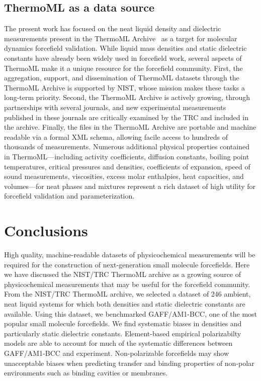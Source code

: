 \documentclass[aip, jcp, reprint]{revtex4-1}  %
\begin{document}
\subsection{ThermoML as a data source}

The present work has focused on the neat liquid density and dielectric measurements present in the ThermoML Archive~\cite{frenkel2006xml, frenkel2003thermoml, chirico2003thermoml} as a target for molecular dynamics forcefield validation.  
While liquid mass densities and static dielectric constants have already been widely used in forcefield work, several aspects of ThermoML make it a unique resource for the forcefield community.  
First, the aggregation, support, and dissemination of ThermoML datasets through the ThermoML Archive is supported by NIST, whose mission makes these tasks a long-term priority.  
Second, the ThermoML Archive is actively growing, through partnerships with several journals, and new experimental measurements published in these journals are critically examined by the TRC and included in the archive.  
Finally, the files in the ThermoML Archive are portable and machine readable via a formal XML schema, allowing facile access to hundreds of thousands of measurements.  
Numerous additional physical properties contained in ThermoML---including activity coefficients, diffusion constants, boiling point temperatures, critical pressures and densities, coefficients of expansion, speed of sound measurements, viscosities, excess molar enthalpies, heat capacities, and volumes---for neat phases and mixtures represent a rich dataset of high utility for forcefield validation and parameterization.


\section{Conclusions}

High quality, machine-readable datasets of physicochemical measurements will be required for the construction of next-generation small molecule forcefields.  
Here we have discussed the NIST/TRC ThermoML archive as a growing source of physicochemical measurements that may be useful for the forcefield community.
From the NIST/TRC ThermoML archive, we selected a dataset of 246 ambient, neat liquid systems for which both densities and static dielectric constants are available.  
Using this dataset, we benchmarked GAFF/AM1-BCC, one of the most popular small molecule forcefields.
We find systematic biases in densities and particularly static dielectric constants.
Element-based empirical polarizabilty models are able to account for much of the systematic differences between GAFF/AM1-BCC and experiment.  
Non-polarizable forcefields may show unacceptable biases when predicting transfer and binding properties of non-polar environments such as binding cavities or membranes.  
\end{document}
